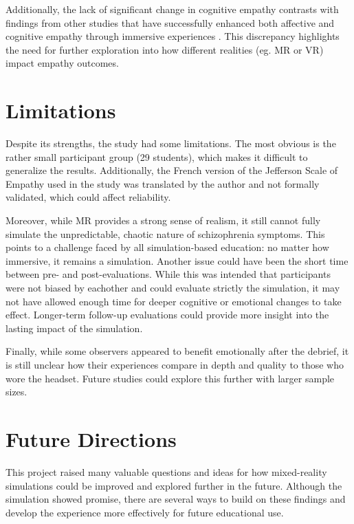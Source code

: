 \vspace{1em}

Additionally, the lack of significant change in cognitive empathy contrasts with findings from other studies that have successfully enhanced both affective and cognitive empathy through immersive experiences \cite{Rueda2020, Ando2011}. This discrepancy highlights the need for further exploration into how different realities (eg. MR or VR) impact empathy outcomes.


\section{Limitations}

Despite its strengths, the study had some limitations. The most obvious is the rather small participant group (29 students), which makes it difficult to generalize the results. Additionally, the French version of the Jefferson Scale of Empathy used in the study was translated by the author and not formally validated, which could affect reliability.

\vspace{1em}

Moreover, while MR provides a strong sense of realism, it still cannot fully simulate the unpredictable, chaotic nature of schizophrenia symptoms. This points to a challenge faced by all simulation-based education: no matter how immersive, it remains a simulation. Another issue could have been the short time between pre- and post-evaluations. While this was intended that participants were not biased by eachother and could evaluate strictly the simulation, it may not have allowed enough time for deeper cognitive or emotional changes to take effect. Longer-term follow-up evaluations could provide more insight into the lasting impact of the simulation.
\vspace{1em}

Finally, while some observers appeared to benefit emotionally after the debrief, it is still unclear how their experiences compare in depth and quality to those who wore the headset. Future studies could explore this further with larger sample sizes.


\section{Future Directions}

This project raised many valuable questions and ideas for how mixed-reality simulations could be improved and explored further in the future. Although the simulation showed promise, there are several ways to build on these findings and develop the experience more effectively for future educational use.


